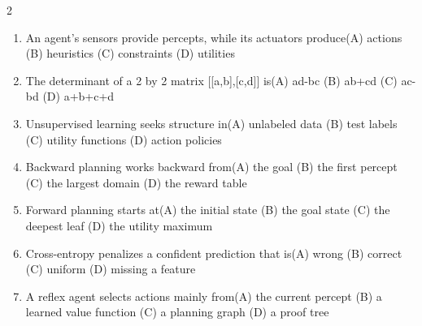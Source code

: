 \documentclass[a4paper]{article}
\begin{document}
\begin{multicols*}{2}
\begin{enumerate}[resume]
\item An agent's sensors provide percepts, while its actuators produce\newline\hspace*{0.6em}(A) actions \quad (B) heuristics \newline\hspace*{0.6em}(C) constraints \quad (D) utilities
\item The determinant of a 2 by 2 matrix [[a,b],[c,d]] is\newline\hspace*{0.6em}(A) ad-bc \quad (B) ab+cd \newline\hspace*{0.6em}(C) ac-bd \quad (D) a+b+c+d
\item Unsupervised learning seeks structure in\newline\hspace*{0.6em}(A) unlabeled data \quad (B) test labels \newline\hspace*{0.6em}(C) utility functions \quad (D) action policies
\item Backward planning works backward from\newline\hspace*{0.6em}(A) the goal \quad (B) the first percept \newline\hspace*{0.6em}(C) the largest domain \quad (D) the reward table
\item Forward planning starts at\newline\hspace*{0.6em}(A) the initial state \quad (B) the goal state \newline\hspace*{0.6em}(C) the deepest leaf \quad (D) the utility maximum
\item Cross-entropy penalizes a confident prediction that is\newline\hspace*{0.6em}(A) wrong \quad (B) correct \newline\hspace*{0.6em}(C) uniform \quad (D) missing a feature
\item A reflex agent selects actions mainly from\newline\hspace*{0.6em}(A) the current percept \quad (B) a learned value function \newline\hspace*{0.6em}(C) a planning graph \quad (D) a proof tree

\end{enumerate}
\end{multicols*}
\end{document}
